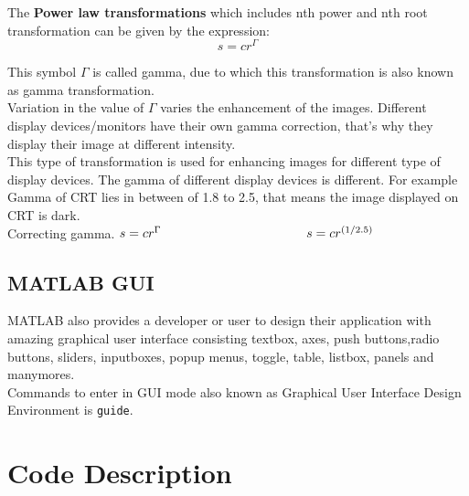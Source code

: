\documentclass[12pt]{article}
\begin{document}
The \textbf{Power law transformations} which includes nth power and nth root transformation can be given by the expression:\\
	$$  s=c r^{\Gamma} $$

This symbol $\Gamma$ is called gamma, due to which this transformation is also known as gamma transformation.\\
Variation in the value of $\Gamma$ varies the enhancement of the images. Different display devices/monitors have their own gamma correction, that’s why they display their image at different intensity.\\

This type of transformation is used for enhancing images for different type of display devices. The gamma of different display devices is different. For example Gamma of CRT lies in between of 1.8 to 2.5, that means the image displayed on CRT is dark.\\
Correcting gamma.
\thinspace\thinspace\thinspace \thinspace$s=cr^{\Gamma}\\ \hspace*{4cm}s=cr^{(1/2.5)}$

\subsection{MATLAB GUI}
MATLAB also provides a developer or user to design their application with amazing graphical user interface consisting textbox, axes, push buttons,radio buttons, sliders, inputboxes, popup menus, toggle, table, listbox, panels and manymores.\\

Commands to enter in GUI mode also known as Graphical User Interface Design Environment is \texttt{guide}. 

\pagebreak

\section{Code Description}
\end{document}

